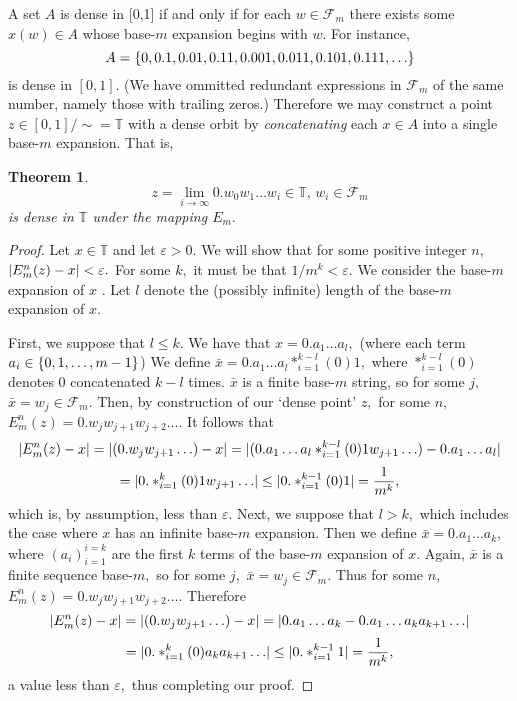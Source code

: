 \documentclass[12pt, letterpaper, oneside]{book}
\renewcommand{\ge}{\ensuremath{\varepsilon}}
\newcommand{\T}{\mathbb{T}}
\DeclarePairedDelimiter{\abs}{\lvert}{\rvert}
\DeclarePairedDelimiter{\set}{\lbrace}{\rbrace}
\theoremstyle{plain}
\newtheorem{theorem}{Theorem}
\theoremstyle{definition}
\theoremstyle{remark}
\begin{document}
A set $A$ is dense in [0,1] if and only if for each $w \in \mathcal{F}_m$ there exists some $x(w) \in A$ whose base-$m$ expansion begins with $w.$ For instance,
\[
A = \set{0, 0.1, 0.01, 0.11, 0.001, 0.011, 0.101, 0.111, \ldots}
\]
is dense in $[0,1].$ (We have ommitted redundant expressions in $\mathcal{F}_m$ of the same number, namely those with trailing zeros.) Therefore we may construct a point $z \in [0,1]/\sim = \T$ with a dense orbit by \textit{concatenating} each $x \in A$ into a single base-$m$ expansion. That is, 
\begin{theorem}
\[
z = \lim\limits_{i \to \infty} 0.w_0w_1\ldots w_i \in \T, \, w_i \in \mathcal{F}_m
\]
is dense in $\T$ under the mapping $E_m.$ 
\end{theorem}
\begin{proof}
Let $x \in \T$ and let $\ge > 0.$ We will show that for some positive integer $n,$ $\abs{E_m^n(z) - x} < \ge.$ For some $k,$ it must be that $1/m^k < \ge.$ We consider the base-$m$ expansion of $x$ . Let $l$ denote the (possibly infinite) length of the base-$m$ expansion of $x.$

First, we suppose that $l \leq k.$ We have that $x = 0.a_1\ldots a_l,$ (where each term $a_i \in \set{0,1,\ldots,m-1}$) We define $\bar{x} = 0.a_1\ldots a_l \ast_{i=1}^{k-l}(0) 1,$ where $\ast_{i=1}^{k-l}(0)$ denotes 0 concatenated $k-l$ times. $\bar{x}$ is a finite base-$m$ string, so for some $j,$ $\bar{x} = w_j \in \mathcal{F}_m.$ Then, by construction of our `dense point' $z,$ for some $n,$ $E_m^n(z) = 0.w_jw_{j+1}w_{j+2}\ldots.$ It follows that 
\[
\abs{E_m^n(z) - x} = \abs{(0.w_jw_{j+1}\ldots) - x} = \abs{(0.a_1\ldots a_l \ast_{i=1}^{k-l}(0)1w_{j+1}\ldots) - 0.a_1\ldots a_l} 
\]
\[
= \abs{0.\ast_{i=1}^{k}(0)1w_{j+1}\ldots} \leq \abs{0.\ast_{i=1}^{k-1}(0)1} = \frac{1}{m^{k}},
\]
which is, by assumption, less than $\ge.$ Next, we suppose that $l > k,$ which includes the case where $x$ has an infinite base-$m$ expansion.  Then we define $\bar{x} = 0.a_1\ldots a_k,$ where $(a_i)_{i=1}^{i = k}$ are the first $k$ terms of the base-$m$ expansion of $x.$ Again, $\bar{x}$ is a finite sequence base-$m,$ so for some $j,$ $\bar{x} = w_j \in \mathcal{F}_m.$ Thus for some $n,$ $E_m^n(z) = 0.w_jw_{j+1}w_{j+2}\ldots.$ Therefore
\[
\abs{E_m^n(z) - x} = \abs{(0.w_jw_{j+1}\ldots) - x} = \abs{0.a_1\ldots a_k - 0.a_1\ldots a_ka_{k+1}\ldots}
\]
\[
= \abs{0.\ast_{i=1}^{k}(0)a_ka_{k+1}\ldots} \leq \abs{0.\ast_{i =1}^{k-1}1} = \frac{1}{m^{k}},
\]
a value less than $\ge,$ thus completing our proof. 
\end{proof}
\end{document}
